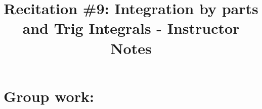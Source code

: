\documentclass[handout,instructornotes]{ximera}
\title{Recitation \#9: Integration by parts and Trig Integrals - Instructor Notes}
\begin{document}
\begin{abstract}		\end{abstract}
\maketitle



\begin{comment}
\section{Warm up:}

	\begin{freeResponse}
	
	\end{freeResponse}
	
\begin{instructorNotes}

\end{instructorNotes}
\end{comment}







\section{Group work:}
\end{document}
